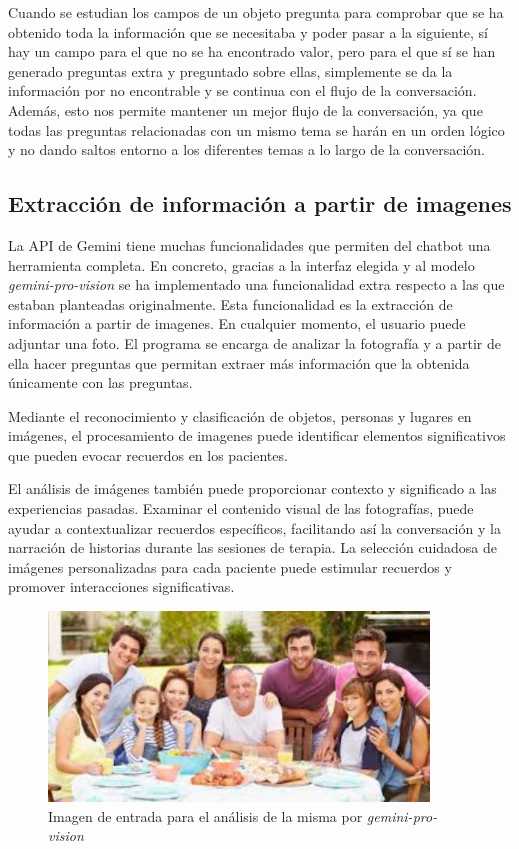 Cuando se estudian los campos de un objeto pregunta para comprobar que se ha obtenido toda la información que se necesitaba y poder pasar a la siguiente, sí hay un campo para el que no se ha encontrado valor, pero para el que sí se han generado preguntas extra y preguntado sobre ellas, simplemente se da la información por no encontrable y se continua con el flujo de la conversación. Además, esto nos permite mantener un mejor flujo de la conversación, ya que todas las preguntas relacionadas con un mismo tema se harán en un orden lógico y no dando saltos entorno a los diferentes temas a lo largo de la conversación. 
\subsection{Extracción de información a partir de imagenes}
\label{sec:imagenes}
La API de Gemini tiene muchas funcionalidades que permiten del chatbot una herramienta completa. En concreto, gracias a la interfaz elegida y al modelo \textit{gemini-pro-vision} se ha implementado una funcionalidad extra respecto a las que estaban planteadas originalmente. Esta funcionalidad es la extracción de información a partir de imagenes. En cualquier momento, el usuario puede adjuntar una foto. El programa se encarga de analizar la fotografía y a partir de ella hacer preguntas que permitan extraer más información que la obtenida únicamente con las preguntas.

Mediante el reconocimiento y clasificación de objetos, personas y lugares en imágenes, el procesamiento de imagenes puede identificar elementos significativos que pueden evocar recuerdos en los pacientes. 

El análisis de imágenes también puede proporcionar contexto y significado a las experiencias pasadas. Examinar el contenido visual de las fotografías, puede ayudar a contextualizar recuerdos específicos, facilitando así la conversación y la narración de historias durante las sesiones de terapia. La selección cuidadosa de imágenes personalizadas para cada paciente puede estimular recuerdos y promover interacciones significativas. 

\begin{figure}[h]
	\centering
	\includegraphics[width=0.9\textwidth]{Imagenes/familia}
	\caption{Imagen de entrada para el análisis de la misma por \textit{gemini-pro-vision}}
	\label{img:familia}
\end{figure}

